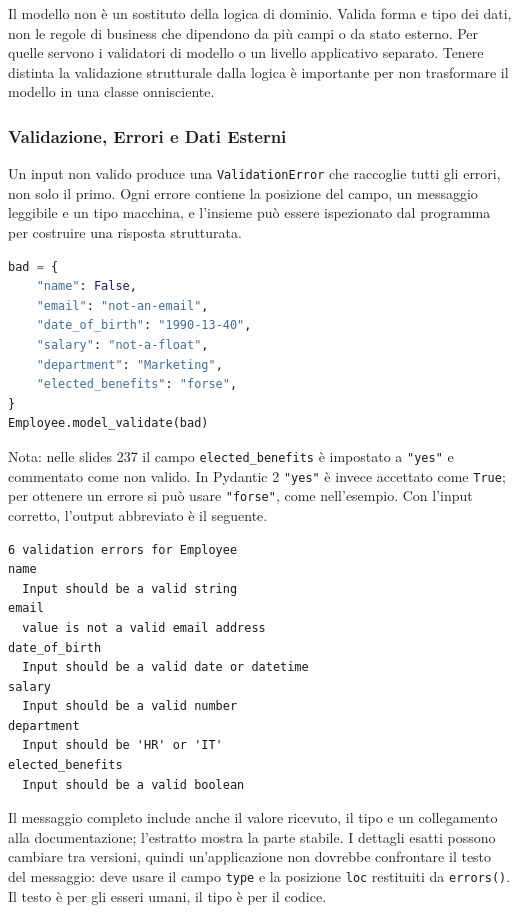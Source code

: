 \documentclass[12pt]{extarticle}
\begin{document}
\noindent Il modello non è un sostituto della logica di dominio. Valida forma e tipo dei dati, non le regole di business che dipendono da più campi o da stato esterno. Per quelle servono i validatori di modello o un livello applicativo separato. Tenere distinta la validazione strutturale dalla logica è importante per non trasformare il modello in una classe onnisciente.

\subsubsection{Validazione, Errori e Dati Esterni}

\noindent Un input non valido produce una \texttt{ValidationError} che raccoglie tutti gli errori, non solo il primo. Ogni errore contiene la posizione del campo, un messaggio leggibile e un tipo macchina, e l'insieme può essere ispezionato dal programma per costruire una risposta strutturata.

\begin{lstlisting}[language=Python]
bad = {
    "name": False,
    "email": "not-an-email",
    "date_of_birth": "1990-13-40",
    "salary": "not-a-float",
    "department": "Marketing",
    "elected_benefits": "forse",
}
Employee.model_validate(bad)
\end{lstlisting}

\noindent Nota: nelle slides 237 il campo \texttt{elected\_benefits} è impostato a \texttt{"yes"} e commentato come non valido. In Pydantic 2 \texttt{"yes"} è invece accettato come \texttt{True}; per ottenere un errore si può usare \texttt{"forse"}, come nell'esempio. Con l'input corretto, l'output abbreviato è il seguente.

\begin{lstlisting}[numbers=none]
6 validation errors for Employee
name
  Input should be a valid string
email
  value is not a valid email address
date_of_birth
  Input should be a valid date or datetime
salary
  Input should be a valid number
department
  Input should be 'HR' or 'IT'
elected_benefits
  Input should be a valid boolean
\end{lstlisting}

\noindent Il messaggio completo include anche il valore ricevuto, il tipo e un collegamento alla documentazione; l'estratto mostra la parte stabile. I dettagli esatti possono cambiare tra versioni, quindi un'applicazione non dovrebbe confrontare il testo del messaggio: deve usare il campo \texttt{type} e la posizione \texttt{loc} restituiti da \texttt{errors()}. Il testo è per gli esseri umani, il tipo è per il codice.
\end{document}
